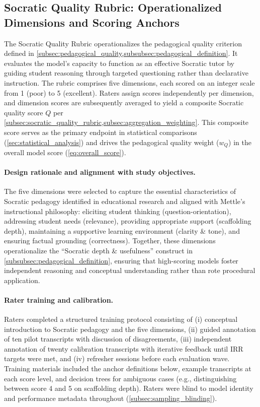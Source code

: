 \subsection{Socratic Quality Rubric: Operationalized Dimensions and Scoring Anchors}
\label{app:socratic_quality_rubric}

The Socratic Quality Rubric operationalizes the pedagogical quality criterion defined in \cref{subsec:pedagogical_quality,subsubsec:pedagogical_definition}. It evaluates the model's capacity to function as an effective Socratic tutor by guiding student reasoning through targeted questioning rather than declarative instruction. The rubric comprises five dimensions, each scored on an integer scale from 1 (poor) to 5 (excellent). Raters assign scores independently per dimension, and dimension scores are subsequently averaged to yield a composite Socratic quality score $Q$ per \cref{subsec:socratic_quality_rubric,subsec:aggregation_weighting}. This composite score serves as the primary endpoint in statistical comparisons (\cref{sec:statistical_analysis}) and drives the pedagogical quality weight ($w_Q$) in the overall model score (\cref{eq:overall_score}).

\paragraph{Design rationale and alignment with study objectives.} The five dimensions were selected to capture the essential characteristics of Socratic pedagogy identified in educational research and aligned with Mettle's instructional philosophy: eliciting student thinking (question-orientation), addressing student needs (relevance), providing appropriate support (scaffolding depth), maintaining a supportive learning environment (clarity \& tone), and ensuring factual grounding (correctness). Together, these dimensions operationalize the ``Socratic depth \& usefulness'' construct in \cref{subsubsec:pedagogical_definition}, ensuring that high-scoring models foster independent reasoning and conceptual understanding rather than rote procedural application.

\paragraph{Rater training and calibration.} Raters completed a structured training protocol consisting of (i) conceptual introduction to Socratic pedagogy and the five dimensions, (ii) guided annotation of ten pilot transcripts with discussion of disagreements, (iii) independent annotation of twenty calibration transcripts with iterative feedback until IRR targets were met, and (iv) refresher sessions before each evaluation wave. Training materials included the anchor definitions below, example transcripts at each score level, and decision trees for ambiguous cases (e.g., distinguishing between score 4 and 5 on scaffolding depth). Raters were blind to model identity and performance metadata throughout (\cref{subsec:sampling_blinding}).

